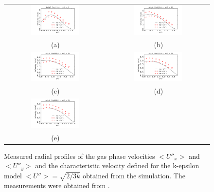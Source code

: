 \documentclass[preprint,12pt,review]{elsarticle}
\begin{document}
\begin{figure}[!htb]
 \centering
\begin{tabular}{cc}
 \includegraphics[width=0.5\textwidth]{../thesis/figuras/chap5/UU/UUx5.png} & \includegraphics[width=0.5\textwidth]{../thesis/figuras/chap5/UU/UUx10.png} \\
(a) & (b) \\
\includegraphics[width=0.5\textwidth]{../thesis/figuras/chap5/UU/UUx15.png} & \includegraphics[width=0.5\textwidth]{../thesis/figuras/chap5/UU/UUx20.png} \\
(c) & (d) \\
\includegraphics[width=0.5\textwidth]{../thesis/figuras/chap5/UU/UUx25.png} &  \\
(e) & \\
\end{tabular}
 \caption{Measured radial profiles of the gas phase velocities $<U''_x>$ and $<U''_y>$ and the characteristic velocity defined for the k-epsilon model $<U''>=\sqrt{2/3 k}$ obtained from the simulation. The measurements were obtained from \citet{chen}.}
\label{fig: UUx}
\end{figure}
\end{document}
